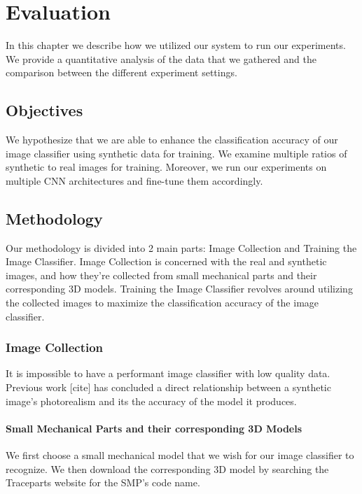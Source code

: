 \chapter{Evaluation}

In this chapter we describe how we utilized our system to run our experiments. We provide a quantitative analysis of the data that we gathered and the comparison between the different experiment settings.

\section{Objectives}

We hypothesize that we are able to enhance the classification accuracy of our image classifier using synthetic data for training. We examine multiple ratios of synthetic to real images for training. Moreover, we run our experiments on multiple CNN architectures and fine-tune them accordingly.


\section{Methodology}

Our methodology is divided into 2 main parts: Image Collection and Training the Image Classifier. Image Collection is concerned with the real and synthetic images, and how they're collected from small mechanical parts and their corresponding 3D models. Training the Image Classifier revolves around utilizing the collected images to maximize the classification accuracy of the image classifier.

\subsection{Image Collection}

It is impossible to have a performant image classifier with low quality data. Previous work [cite] has concluded a direct relationship between a synthetic image's photorealism and its the accuracy of the model it produces.

\subsubsection{Small Mechanical Parts and their corresponding 3D Models}
We first choose a small mechanical model that we wish for our image classifier to recognize. We then download the corresponding 3D model by searching the Traceparts website \cite{traceparts} for the SMP's code name.

